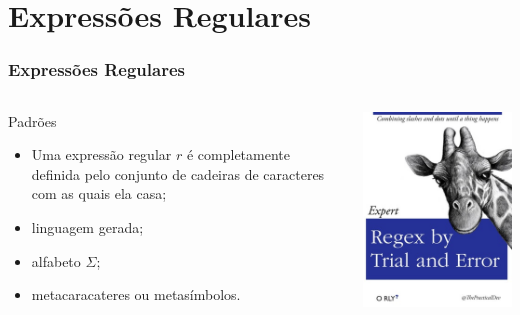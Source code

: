 \documentclass[table]{beamer}
\begin{document}
\section{Expressões Regulares}
\begin{frame}
   \frametitle{Expressões Regulares}
   \begin{columns}
      \begin{column}{0.5\textwidth}
         \begin{block}{Padrões}
            \begin{itemize}
               \item Uma expressão regular $r$ é completamente definida pelo conjunto de cadeiras de caracteres com as quais ela casa;
	       \item linguagem gerada;
	       \item alfabeto $\Sigma$;
	       \item metacaracateres ou metasímbolos.
            \end{itemize}
        \end{block}
      \end{column}
      \begin{column}{0.5\textwidth}
         \includegraphics[width=\linewidth,height=\textheight,keepaspectratio]{figuras/trialanderror.jpg}
      \end{column}
   \end{columns}
\end{frame}
\end{document}
